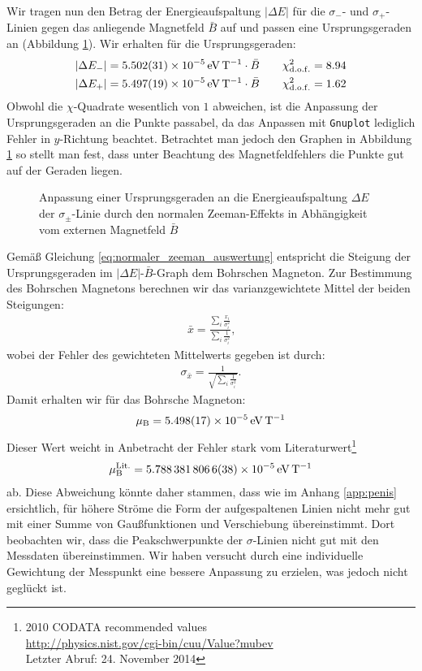 \documentclass[11pt, a4paper]{article}
\begin{document}
Wir tragen nun den Betrag der Energieaufspaltung $|\Delta E|$ für die $\sigma_-$- und $\sigma_+$-Linien gegen das anliegende Magnetfeld $\bar{B}$ auf und passen eine Ursprungsgeraden an (Abbildung \ref{fig:magneton_fit}).
Wir erhalten für die Ursprungsgeraden:
\begin{align}
	|\Delta E_{-}| = \SI{5.502 +- 0.031e-5}{\electronvolt\per\tesla} \cdot \bar{B} \qquad \chi_\mathrm{d.o.f.}^2 = 8.94\\
	|\Delta E_{+}| = \SI{5.497 +- 0.019e-5}{\electronvolt\per\tesla} \cdot \bar{B} \qquad \chi_\mathrm{d.o.f.}^2 = 1.62
\end{align}
Obwohl die $\chi$-Quadrate wesentlich von $1$ abweichen, ist die Anpassung der Ursprungsgeraden an die Punkte passabel, da das Anpassen mit \texttt{Gnuplot} lediglich Fehler in $y$-Richtung beachtet.
Betrachtet man jedoch den Graphen in Abbildung \ref{fig:magneton_fit} so stellt man fest, dass unter Beachtung des Magnetfeldfehlers die Punkte gut auf der Geraden liegen.
\begin{figure}[h]
	\centering
	
	\caption{Anpassung einer Ursprungsgeraden an die Energieaufspaltung $\Delta E$ der $\sigma_\pm$-Linie durch den normalen Zeeman-Effekts in Abhängigkeit vom externen Magnetfeld $\bar{B}$}
	\label{fig:magneton_fit}
\end{figure}
Gemäß Gleichung \ref{eq:normaler_zeeman_auswertung} entspricht die Steigung der Ursprungsgeraden im $|\Delta E|$-$\bar{B}$-Graph dem Bohrschen Magneton. Zur Bestimmung des Bohrschen Magnetons berechnen wir das varianzgewichtete Mittel der beiden Steigungen:
\begin{align}
	\bar{x} = \frac{\sum_i \frac{x_i}{\sigma_i^2}}{\sum_i \frac{1}{\sigma_i^2}}\text{,}
\end{align}
wobei der Fehler des gewichteten Mittelwerts gegeben ist durch:
\begin{align}
	\sigma_{\bar{x}} = \frac{1}{\sqrt{\sum_i \frac{1}{\sigma_i^2}}}\text{.}
\end{align}
Damit erhalten wir für das Bohrsche Magneton:
\begin{align}
	\mu_\mathrm{B} = \SI{5.498 +- 0.017e-5}{\electronvolt\per\tesla}
\end{align}
Dieser Wert weicht in Anbetracht der Fehler stark vom Literaturwert\footnote{2010 CODATA recommended values\\ \url{http://physics.nist.gov/cgi-bin/cuu/Value?mubev}\\ Letzter Abruf: 24. November 2014}
\begin{align}
	\mu_\mathrm{B}^{\mathrm{Lit.}} = \SI{5.7883818066 +- 0.0000000038e-5}{\electronvolt\per\tesla}
\end{align}
ab.
Diese Abweichung könnte daher stammen, dass wie im Anhang \ref{app:penis} ersichtlich, für höhere Ströme die Form der aufgespaltenen Linien nicht mehr gut mit einer Summe von Gaußfunktionen und Verschiebung übereinstimmt.
Dort beobachten wir, dass die Peakschwerpunkte der $\sigma$-Linien nicht gut mit den Messdaten übereinstimmen.
Wir haben versucht durch eine individuelle Gewichtung der Messpunkt eine bessere Anpassung zu erzielen, was jedoch nicht geglückt ist.
\end{document}
